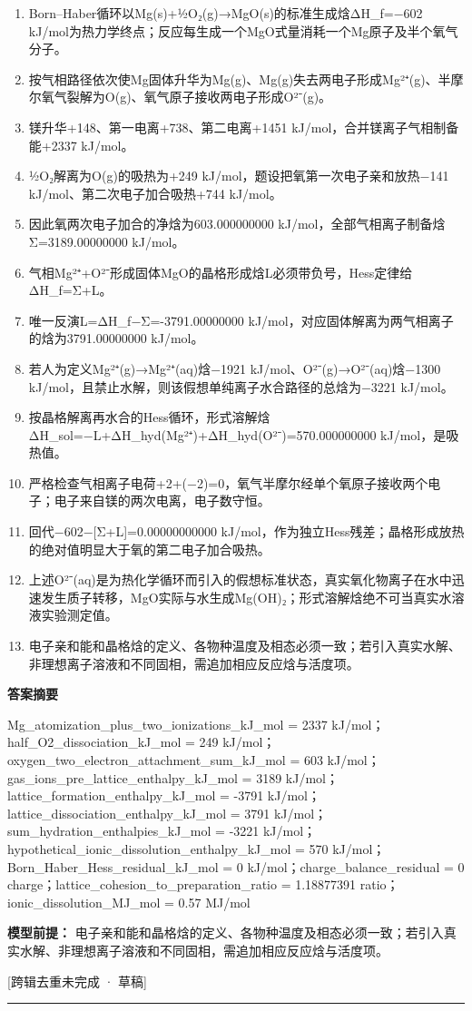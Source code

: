 \documentclass[UTF8,11pt,a4paper]{ctexart}
\begin{document}
\begin{enumerate}
\item Born–Haber循环以Mg(s)+½O₂(g)→MgO(s)的标准生成焓ΔH\_f=−602 kJ/mol为热力学终点；反应每生成一个MgO式量消耗一个Mg原子及半个氧气分子。
\item 按气相路径依次使Mg固体升华为Mg(g)、Mg(g)失去两电子形成Mg²⁺(g)、半摩尔氧气裂解为O(g)、氧气原子接收两电子形成O²⁻(g)。
\item 镁升华+148、第一电离+738、第二电离+1451 kJ/mol，合并镁离子气相制备能+2337 kJ/mol。
\item ½O₂解离为O(g)的吸热为+249 kJ/mol，题设把氧第一次电子亲和放热−141 kJ/mol、第二次电子加合吸热+744 kJ/mol。
\item 因此氧两次电子加合的净焓为603.000000000 kJ/mol，全部气相离子制备焓Σ=3189.00000000 kJ/mol。
\item 气相Mg²⁺+O²⁻形成固体MgO的晶格形成焓L必须带负号，Hess定律给ΔH\_f=Σ+L。
\item 唯一反演L=ΔH\_f−Σ=-3791.00000000 kJ/mol，对应固体解离为两气相离子的焓为3791.00000000 kJ/mol。
\item 若人为定义Mg²⁺(g)→Mg²⁺(aq)焓−1921 kJ/mol、O²⁻(g)→O²⁻(aq)焓−1300 kJ/mol，且禁止水解，则该假想单纯离子水合路径的总焓为−3221 kJ/mol。
\item 按晶格解离再水合的Hess循环，形式溶解焓ΔH\_sol=−L+ΔH\_hyd(Mg²⁺)+ΔH\_hyd(O²⁻)=570.000000000 kJ/mol，是吸热值。
\item 严格检查气相离子电荷+2+(−2)=0，氧气半摩尔经单个氧原子接收两个电子；电子来自镁的两次电离，电子数守恒。
\item 回代−602−[Σ+L]=0.00000000000 kJ/mol，作为独立Hess残差；晶格形成放热的绝对值明显大于氧的第二电子加合吸热。
\item 上述O²⁻(aq)是为热化学循环而引入的假想标准状态，真实氧化物离子在水中迅速发生质子转移，MgO实际与水生成Mg(OH)₂；形式溶解焓绝不可当真实水溶液实验测定值。
\item 电子亲和能和晶格焓的定义、各物种温度及相态必须一致；若引入真实水解、非理想离子溶液和不同固相，需追加相应反应焓与活度项。
\end{enumerate}
\noindent\textbf{答案摘要}\par
Mg\_atomization\_plus\_two\_ionizations\_kJ\_mol = 2337 kJ/mol；half\_O2\_dissociation\_kJ\_mol = 249 kJ/mol；oxygen\_two\_electron\_attachment\_sum\_kJ\_mol = 603 kJ/mol；gas\_ions\_pre\_lattice\_enthalpy\_kJ\_mol = 3189 kJ/mol；lattice\_formation\_enthalpy\_kJ\_mol = -3791 kJ/mol；lattice\_dissociation\_enthalpy\_kJ\_mol = 3791 kJ/mol；sum\_hydration\_enthalpies\_kJ\_mol = -3221 kJ/mol；hypothetical\_ionic\_dissolution\_enthalpy\_kJ\_mol = 570 kJ/mol；Born\_Haber\_Hess\_residual\_kJ\_mol = 0 kJ/mol；charge\_balance\_residual = 0 charge；lattice\_cohesion\_to\_preparation\_ratio = 1.18877391 ratio；ionic\_dissolution\_MJ\_mol = 0.57 MJ/mol\par
\noindent\textbf{模型前提：}
电子亲和能和晶格焓的定义、各物种温度及相态必须一致；若引入真实水解、非理想离子溶液和不同固相，需追加相应反应焓与活度项。\par
\noindent\textcolor{red!65!black}{[跨辑去重未完成 · 草稿]} \par
\medskip\hrule\medskip
{}
\end{document}
